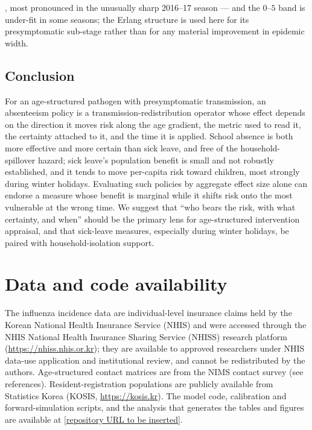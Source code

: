 \documentclass[12pt]{article}
\theoremstyle{plain}
\theoremstyle{remark}
\theoremstyle{definition}
\begin{document}
\cite{Wearing2005}, most pronounced in the unusually sharp 2016--17 season --- and the $0$--$5$ band is under-fit in some seasons; the Erlang structure is used here for its presymptomatic sub-stage rather than for any material improvement in epidemic width.

\subsection{Conclusion}
For an age-structured pathogen with presymptomatic transmission, an absenteeism policy is a transmission-redistribution operator whose effect depends on the direction it moves risk along the age gradient, the metric used to read it, the certainty attached to it, and the time it is applied. School absence is both more effective and more certain than sick leave, and free of the household-spillover hazard; sick leave's population benefit is small and not robustly established, and it tends to move per-capita risk toward children, most strongly during winter holidays. Evaluating such policies by aggregate effect size alone can endorse a measure whose benefit is marginal while it shifts risk onto the most vulnerable at the wrong time. We suggest that ``who bears the risk, with what certainty, and when'' should be the primary lens for age-structured intervention appraisal, and that sick-leave measures, especially during winter holidays, be paired with household-isolation support.

\section*{Data and code availability}
The influenza incidence data are individual-level insurance claims held by the
Korean National Health Insurance Service (NHIS) and were accessed through the
NHIS National Health Insurance Sharing Service (NHISS) research platform
(\url{https://nhiss.nhis.or.kr}); they are available to approved researchers
under NHIS data-use application and institutional review, and cannot be
redistributed by the authors. Age-structured contact matrices are from the NIMS
contact survey (see references). Resident-registration populations are publicly
available from Statistics Korea (KOSIS, \url{https://kosis.kr}). The model code,
calibration and forward-simulation scripts, and the analysis that generates the
tables and figures are available at
\href{https://github.com/}{[repository URL to be inserted]}.



\end{document}
